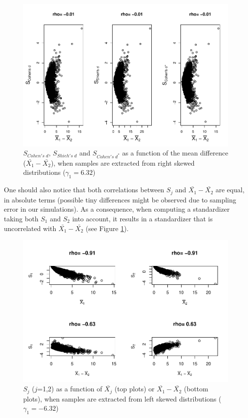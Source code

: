 \documentclass[
  english,
  man,mask]{apa6}
\begin{document}
\begin{figure}
\centering
\includegraphics{Correlation_files/figure-latex/pltStdzrHombalRskew-1.pdf}
\caption{\label{fig:pltStdzrHombalRskew}\(S_{Cohen's \; d}\), \(S_{Shieh's \; d}\) and \(S_{Cohen's \; d^*}\) as a function of the mean difference (\(\bar{X_1}-\bar{X_2}\)), when samples are extracted from right skewed distributions (\(\gamma_1 = 6.32\))}
\end{figure}

One should also notice that both correlations between \(S_j\) and \(\bar{X_1}-\bar{X_2}\) are equal, in absolute terms (possible tiny differences might be observed due to sampling error in our simulations). As a consequence, when computing a standardizer taking both \(S_1\) and \(S_2\) into account, it results in a standardizer that is uncorrelated with \(\bar{X_1}-\bar{X_2}\) (see Figure \ref{fig:pltStdzrHombalRskew}).

\begin{figure}
\centering
\includegraphics{Correlation_files/figure-latex/pltSDHombalLskew-1.pdf}
\caption{\label{fig:pltSDHombalLskew}\(S_j\) (\(j\)=1,2) as a function of \(\bar{X_j}\) (top plots) or \(\bar{X_1}-\bar{X_2}\) (bottom plots), when samples are extracted from left skewed distributions (\(\gamma_1 = -6.32\))}
\end{figure}
\end{document}
